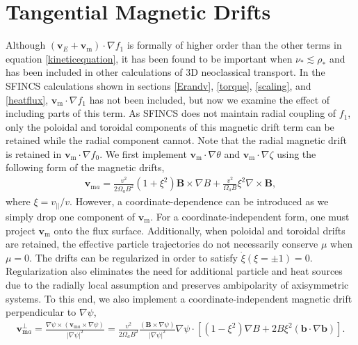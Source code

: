 \documentclass[aip, pop, preprint]{revtex4-1}
\numberwithin{figure}{section}
\numberwithin{equation}{section}
\begin{document}
\section{Tangential Magnetic Drifts}\label{mds}
Although $(\bm{v}_E + \bm{v}_{\mathrm{m}}) \cdot \nabla f_1$ is formally of higher order than the other terms in equation \ref{kineticequation}, it has been found to be important when $\nu_* \lesssim \rho_*$ \cite{Calvo2016, Matsuoka2015} and has been included in other calculations of 3D neoclassical transport. In the SFINCS calculations shown in sections \ref{Erandv}, \ref{torque}, \ref{scaling}, and \ref{heatflux}, $\bm{v}_{\mathrm{m}} \cdot \nabla f_1$ has not been included, but now we examine the effect of including parts of this term. As SFINCS does not maintain radial coupling of $f_1$, only the poloidal and toroidal components of this magnetic drift term can be retained while the radial component cannot. Note that the radial magnetic drift is retained in $\bm{v}_{\mathrm{m}} \cdot \nabla f_0$. We first implement $\bm{v}_{\mathrm{m}} \cdot \nabla \theta$ and $\bm{v}_{\mathrm{m}}  \cdot \nabla \zeta$ using the following form of the magnetic drifts,
\begin{gather}
\bm{v}_{\mathrm{m} a} = \frac{v^2}{2 \Omega_a B^2} (1 + \xi^2) \bm{B} \times \nabla B + \frac{v^2}{\Omega_a B} \xi^2 \nabla \times \bm{B},
\label{eq:mds1}
\end{gather}
where $\xi = v_{||}/v$. However, a coordinate-dependence can be introduced as we simply drop one component of $\bm{v}_{\mathrm{m}}$. For a coordinate-independent form, one must project $\bm{v}_{\mathrm{m}}$ onto the flux surface. Additionally, when poloidal and toroidal drifts are retained, the effective particle trajectories do not necessarily conserve $\mu$ when $\mu = 0$. The drifts can be regularized in order to satisfy $\dot{\xi} (\xi = \pm 1) = 0$. Regularization also eliminates the need for additional particle and heat sources due to the radially local assumption and preserves ambipolarity of axisymmetric systems.\cite{Sugama2016} To this end, we also implement a coordinate-independent magnetic drift perpendicular to $\nabla \psi$,
\begin{gather}
\bm{v}_{\mathrm{m}a}^{\perp} = \frac{\nabla \psi \times (\bm{v}_{\mathrm{m}a} \times \nabla \psi)}{\rvert \nabla \psi \rvert^2}= \frac{v^2}{2\Omega_a B^2 } \frac{(\bm{B} \times \nabla \psi)}{\rvert \nabla \psi \rvert^2} \nabla \psi \cdot\left[(1-\xi^2)\nabla B + 2B\xi^2 (\bm{b} \cdot \nabla \bm{b}) \right].
\end{gather}
\end{document}
